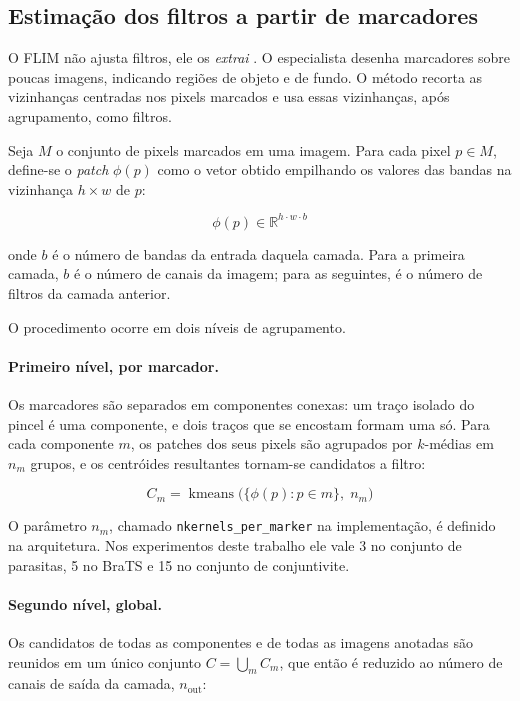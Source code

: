 \subsection{Estimação dos filtros a partir de marcadores}

O \ac{FLIM} não ajusta filtros, ele os \emph{extrai} \cite{souza2020flim}. O especialista desenha marcadores sobre poucas imagens, indicando regiões de objeto e de fundo. O método recorta as vizinhanças centradas nos pixels marcados e usa essas vizinhanças, após agrupamento, como filtros.

Seja $M$ o conjunto de pixels marcados em uma imagem. Para cada pixel $p \in M$, define-se o \emph{patch} $\phi(p)$ como o vetor obtido empilhando os valores das bandas na vizinhança $h \times w$ de $p$:

\begin{equation}
\phi(p) \in \mathbb{R}^{h \cdot w \cdot b}
\label{eq_patch}
\end{equation}

onde $b$ é o número de bandas da entrada daquela camada. Para a primeira camada, $b$ é o número de canais da imagem; para as seguintes, é o número de filtros da camada anterior.

O procedimento ocorre em dois níveis de agrupamento.

\paragraph{Primeiro nível, por marcador.} Os marcadores são separados em componentes conexas: um traço isolado do pincel é uma componente, e dois traços que se encostam formam uma só. Para cada componente $m$, os patches dos seus pixels são agrupados por $k$-médias em $n_m$ grupos, e os centróides resultantes tornam-se candidatos a filtro:

\begin{equation}
C_m = \operatorname{kmeans}\big(\{\phi(p) : p \in m\},\; n_m\big)
\label{eq_nivel1}
\end{equation}

O parâmetro $n_m$, chamado \texttt{nkernels\_per\_marker} na implementação, é definido na arquitetura. Nos experimentos deste trabalho ele vale 3 no conjunto de parasitas, 5 no BraTS e 15 no conjunto de conjuntivite.

\paragraph{Segundo nível, global.} Os candidatos de todas as componentes e de todas as imagens anotadas são reunidos em um único conjunto $C = \bigcup_m C_m$, que então é reduzido ao número de canais de saída da camada, $n_{\text{out}}$:


